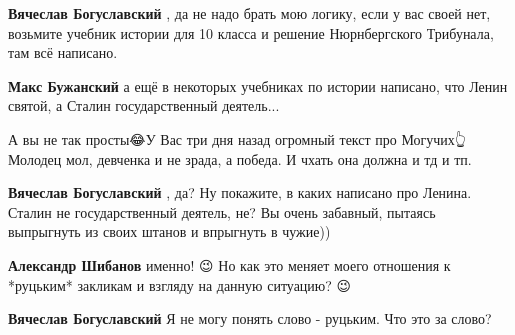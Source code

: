 \begin{itemize}
\begin{itemize}
\textbf{Вячеслав Богуславский} , да не надо брать мою логику, если у вас своей нет, возьмите учебник истории для 10 класса и решение Нюрнбергского Трибунала, там всё написано.

 
\textbf{Макс Бужанский} а ещё в некоторых учебниках по истории написано, что Ленин святой, а Сталин государственный деятель...

 
А вы не так просты😂У Вас три дня назад огромный текст про Могучих👆Молодец
мол, девченка и не зрада, а победа. И чхать она должна и тд и тп.

 
\textbf{Вячеслав Богуславский} , да? Ну покажите, в каких написано про Ленина. Сталин не государственный деятель, не? Вы очень забавный, пытаясь выпрыгнуть из своих штанов и впрыгнуть в чужие))

 
\textbf{Александр Шибанов} именно! 😉 Но как это меняет моего отношения к *руцьким* закликам и взгляду на данную ситуацию? 😉

 
\textbf{Вячеслав Богуславский} Я не могу понять слово - руцьким. Что это за слово?


\end{itemize}
\end{itemize}
